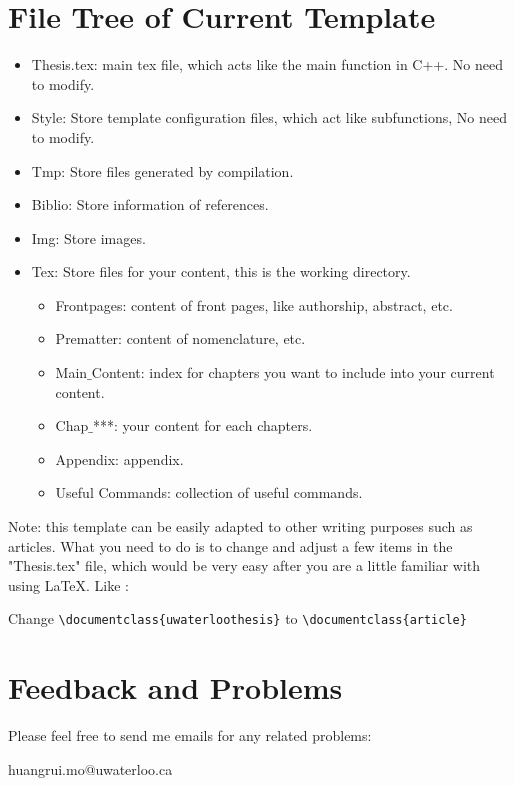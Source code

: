 \section{File Tree of Current Template} %
\begin{itemize}
    \item Thesis.tex: main tex file, which acts like the main function in C++. No need to modify.
    \item Style: Store template configuration files, which act like subfunctions, No need to modify.
    \item Tmp: Store files generated by compilation.
    \item Biblio: Store information of references.
    \item Img: Store images.
    \item Tex: Store files for your content, this is the working directory.
        \begin{itemize}
            \item Frontpages: content of front pages, like authorship, abstract, etc.
            \item Prematter: content of nomenclature, etc.
            \item Main$\_$Content: index for chapters you want to include into your current content.
            \item Chap$\_$***: your content for each chapters.
            \item Appendix: appendix.
            \item Useful Commands: collection of useful commands.
        \end{itemize}
\end{itemize}

Note: this template can be easily adapted to other writing purposes such as articles. What you need to do is to change and adjust a few items in the "Thesis.tex" file, which would be very easy after you are a little familiar with using \LaTeX{}. Like :

Change \verb+\documentclass{uwaterloothesis}+ to \verb+\documentclass{article}+

\section{Feedback and Problems} %
Please feel free to send me emails for any related problems:
\begin{center}
huangrui.mo@uwaterloo.ca
\end{center}
